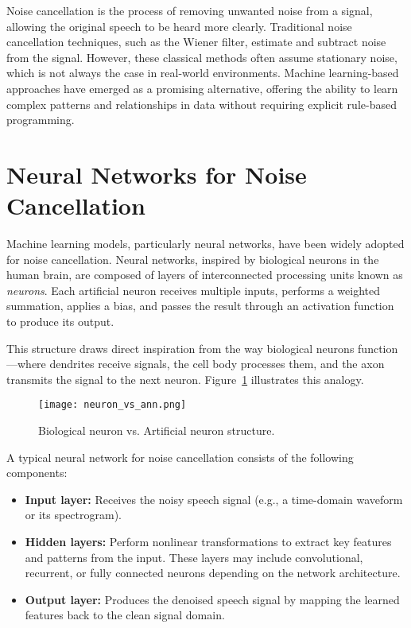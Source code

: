 Noise cancellation is the process of removing unwanted noise from a signal, allowing the original speech to be heard more clearly. Traditional noise cancellation techniques, such as the Wiener filter, estimate and subtract noise from the signal. However, these classical methods often assume stationary noise, which is not always the case in real-world environments. Machine learning-based approaches have emerged as a promising alternative, offering the ability to learn complex patterns and relationships in data without requiring explicit rule-based programming.

\section{Neural Networks for Noise Cancellation}
\label{sec:neural_networks}

Machine learning models, particularly neural networks, have been widely adopted for noise cancellation. Neural networks, inspired by biological neurons in the human brain, are composed of layers of interconnected processing units known as \textit{neurons}. Each artificial neuron receives multiple inputs, performs a weighted summation, applies a bias, and passes the result through an activation function to produce its output.

This structure draws direct inspiration from the way biological neurons function—where dendrites receive signals, the cell body processes them, and the axon transmits the signal to the next neuron. Figure~\ref{fig:neuron_vs_ann} illustrates this analogy.

\begin{figure}[H]
    \centering
    \texttt{[image: neuron\_vs\_ann.png]}
    \caption{Biological neuron vs. Artificial neuron structure.\cite{ghosh2020perceptron}}
    \label{fig:neuron_vs_ann}
\end{figure}

A typical neural network for noise cancellation consists of the following components:
\begin{itemize}
    \item \textbf{Input layer:} Receives the noisy speech signal (e.g., a time-domain waveform or its spectrogram).
    \item \textbf{Hidden layers:} Perform nonlinear transformations to extract key features and patterns from the input. These layers may include convolutional, recurrent, or fully connected neurons depending on the network architecture.
    \item \textbf{Output layer:} Produces the denoised speech signal by mapping the learned features back to the clean signal domain.
\end{itemize}

